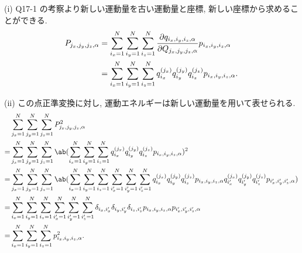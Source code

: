 \documentclass[uplatex,diffipdfmx,a4paper,11pt]{jlreq}
\theoremstyle{definition}
\begin{document}
(i) Q17-1 の考察より新しい運動量を古い運動量と座標, 新しい座標から求めることができる.
\begin{align}
  P_{j_x,j_y,j_z,\alpha} & = \sum_{i_x=1}^{N}\sum_{i_y=1}^{N}\sum_{i_z=1}^{N}\diffp{q_{i_x,i_y,i_z,\alpha}}{Q_{j_x,j_y,j_z,\alpha}}p_{i_x,i_y,i_z,\alpha} \\
                         & = \sum_{i_x=1}^{N}\sum_{i_y=1}^{N}\sum_{i_z=1}^{N}q_{i_x}^{(j_x)}q_{i_y}^{(j_y)}q_{i_z}^{(j_z)}p_{i_x,i_y,i_z,\alpha}.
\end{align}

(ii) この点正準変換に対し, 運動エネルギーは新しい運動量を用いて表せられる.
\begin{align}
    & \sum_{j_x=1}^{N}\sum_{j_y=1}^{N}\sum_{j_z=1}^{N}P_{j_x,j_y,j_z,\alpha}^2                                                                                                                                                                                                                             \\
  = & \sum_{j_x=1}^{N}\sum_{j_y=1}^{N}\sum_{j_z=1}^{N}\ab(\sum_{i_x=1}^{N}\sum_{i_y=1}^{N}\sum_{i_z=1}^{N}q_{i_x}^{(j_x)}q_{i_y}^{(j_y)}q_{i_z}^{(j_z)}p_{i_x,i_y,i_z,\alpha})^2                                                                                                                           \\
  = & \sum_{j_x=1}^{N}\sum_{j_y=1}^{N}\sum_{j_z=1}^{N}\ab(\sum_{i_x=1}^{N}\sum_{i_y=1}^{N}\sum_{i_z=1}^{N}\sum_{i_x'=1}^{N}\sum_{i_y'=1}^{N}\sum_{i_z'=1}^{N}q_{i_x}^{(j_x)}q_{i_y}^{(j_y)}q_{i_z}^{(j_z)}p_{i_x,i_y,i_z,\alpha}q_{i_x'}^{(j_x)}q_{i_y'}^{(j_y)}q_{i_z'}^{(j_z)}p_{i_x',i_y',i_z',\alpha}) \\
  = & \sum_{i_x=1}^{N}\sum_{i_y=1}^{N}\sum_{i_z=1}^{N}\sum_{i_x'=1}^{N}\sum_{i_y'=1}^{N}\sum_{i_z'=1}^{N}\delta_{i_x,i_x'}\delta_{i_y,i_y'}\delta_{i_z,i_z'}p_{i_x,i_y,i_z,\alpha}p_{i_x',i_y',i_z',\alpha}                                                                                                \\
  = & \sum_{i_x=1}^{N}\sum_{i_y=1}^{N}\sum_{i_z=1}^{N}p_{i_x,i_y,i_z,\alpha}^2.
\end{align}
\end{document}
